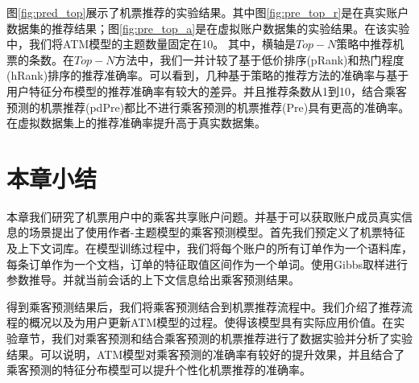 \begin{figure}
\centering
{}
\end{figure}

图\ref{fig:pred_top}展示了机票推荐的实验结果。其中图\ref{fig:pre_top_r}是在真实账户数据集的推荐结果；图\ref{fig:pre_top_a}是在虚拟账户数据集的实验结果。在该实验中，我们将ATM模型的主题数量固定在10。
其中，横轴是$Top-N$策略中推荐机票的条数。在$Top-N$方法中，我们一并计较了基于低价排序(pRank)和热门程度(hRank)排序的推荐准确率。可以看到，几种基于策略的推荐方法的准确率与基于用户特征分布模型的推荐准确率有较大的差异。并且推荐条数从1到10，结合乘客预测的机票推荐(pdPre)都比不进行乘客预测的机票推荐(Pre)具有更高的准确率。在虚拟数据集上的推荐准确率提升高于真实数据集。


\section{本章小结}

本章我们研究了机票用户中的乘客共享账户问题。并基于可以获取账户成员真实信息的场景提出了使用作者-主题模型的乘客预测模型。首先我们预定义了机票特征及上下文词库。在模型训练过程中，我们将每个账户的所有订单作为一个语料库，每条订单作为一个文档，订单的特征取值区间作为一个单词。使用Gibbs取样进行参数推导。并就当前会话的上下文信息给出乘客预测结果。

得到乘客预测结果后，我们将乘客预测结合到机票推荐流程中。我们介绍了推荐流程的概况以及为用户更新ATM模型的过程。使得该模型具有实际应用价值。在实验章节，我们对乘客预测和结合乘客预测的机票推荐进行了数据实验并分析了实验结果。可以说明，ATM模型对乘客预测的准确率有较好的提升效果，并且结合了乘客预测的特征分布模型可以提升个性化机票推荐的准确率。